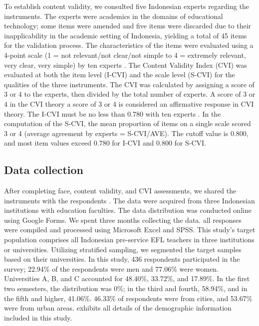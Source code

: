 \documentclass[english]{textolivre}
\begin{document}
To establish content validity, we consulted five Indonesian experts regarding the instruments. The experts were academics in the domains of educational technology; some items were amended and five items were discarded due to their inapplicability in the academic setting of Indonesia, yielding a total of 45 items for the validation process. The characteristics of the items were evaluated using a 4-point scale (1 = not relevant/not clear/not simple to 4 = extremely relevant, very clear, very simple) by ten experts \cite{habibi2020tpack}. The Content Validity Index (CVI) was evaluated at both the item level (I-CVI) and the scale level (S-CVI) for the qualities of the three instruments. The CVI was calculated by assigning a score of 3 or 4 to the experts, then divided by the total number of experts. A score of 3 or 4 in the CVI theory a score of 3 or 4 is considered an affirmative response in CVI theory. The I-CVI must be no less than 0.780 with ten experts \cite{oliveira2022insulin}. In the computation of the S-CVI, the mean proportion of items on a single scale scored 3 or 4 (average agreement by experts = S-CVI/AVE). The cutoff value is 0.800, and most item values exceed 0.780 for I-CVI and 0.800 for S-CVI. 


\subsection{Data collection}\label{sec-resumo}
After completing face, content validity, and CVI assessments, we shared the instruments with the respondents \cite{rimando2015challenges}. The data were acquired from three Indonesian institutions with education faculties. The data distribution was conducted online using Google Forms. We spent three months collecting the data. all responses were compiled and processed using Microsoft Excel and SPSS. This study’s target population comprises all Indonesian pre-service EFL teachers in three institutions or universities. Utilizing stratified sampling, we segmented the target samples based on their universities. In this study, 436 respondents participated in the survey; 22.94\% of the respondents were men and 77.06\% were women. Universities A, B, and C accounted for 48.40\%, 33.72\%, and 17.89\%. In the first two semesters, the distribution was 0\%; in the third and fourth, 58.94\%, and in the fifth and higher, 41.06\%. 46.33\% of respondents were from cities, and 53.67\% were from urban areas.  exhibits all details of the demographic information included in this study.
\end{document}
